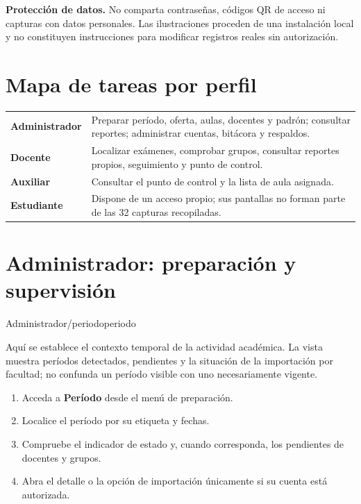 \documentclass[11pt,a4paper]{article}
\begin{document}
\begin{notebox}
\textbf{Protección de datos.}
No comparta contraseñas, códigos QR de acceso ni capturas
con datos personales. Las ilustraciones proceden de una
instalación local y no constituyen instrucciones para
modificar registros reales sin autorización.
\end{notebox}

\section{Mapa de tareas por perfil}

\begin{tabularx}{\linewidth}{>{\bfseries}p{30mm}X}
\toprule
Administrador &
Preparar período, oferta, aulas, docentes y padrón;
consultar reportes; administrar cuentas, bitácora y respaldos.\\
Docente &
Localizar exámenes, comprobar grupos, consultar reportes
propios, seguimiento y punto de control.\\
Auxiliar &
Consultar el punto de control y la lista de aula asignada.\\
Estudiante &
Dispone de un acceso propio; sus pantallas no forman parte
de las 32 capturas recopiladas.\\
\bottomrule
\end{tabularx}

\section{Administrador: preparación y supervisión}

{Administrador}{/periodo}{periodo}

Aquí se establece el contexto temporal de la actividad
académica. La vista muestra períodos detectados, pendientes
y la situación de la importación por facultad; no confunda
un período visible con uno necesariamente vigente.

\pasos
\begin{enumerate}
\item Acceda a \textbf{Período} desde el menú de preparación.
\item Localice el período por su etiqueta y fechas.
\item Compruebe el indicador de estado y, cuando corresponda,
los pendientes de docentes y grupos.
\item Abra el detalle o la opción de importación únicamente
si su cuenta está autorizada.
\end{enumerate}
\end{document}

